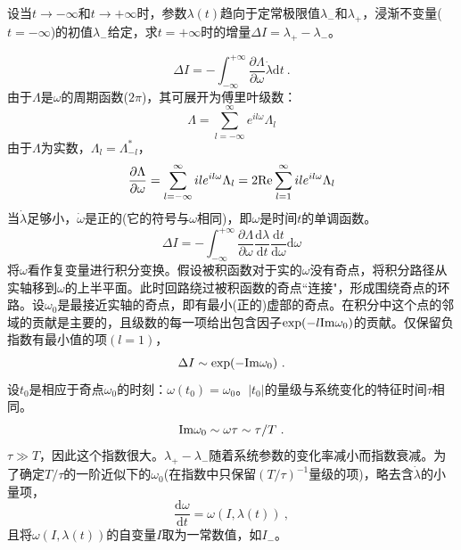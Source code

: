 \documentclass[11pt,a4paper]{article}
\newcommand{\dif}{\mathrm{d}}
\begin{document}
设当$t \rightarrow -\infty$和$t \rightarrow +\infty$时，参数$\lambda(t)$趋向于定常极限值$\lambda_{-}$和$\lambda_{+}$，浸渐不变量($t = -\infty$)的初值$\lambda_{-}$给定，求$t = +\infty$时的增量$\Delta I = \lambda_{+} -\lambda_{-}$。


\begin{equation}
\Delta I = -\int_{-\infty}^{+\infty} \dfrac{\partial \Lambda}{\partial \omega} \dot \lambda  \dif t ~.
\end{equation}
由于$\Lambda$是$\omega$的周期函数($2\pi$)，其可展开为傅里叶级数：
\begin{equation}
\Lambda = \sum_{l=-\infty}^\infty e^{il\omega} \Lambda_l 
\end{equation}
由于$ \Lambda$为实数，$ \Lambda_l  =  \Lambda^\ast_{-l} $，
\begin{equation}
\dfrac{\partial \Lambda}{\partial \omega} = \sum_{l=-\infty}^\infty il e^{il\omega} \Lambda_l = 2{\rm Re} \sum_{l=1}^\infty il e^{il\omega} \Lambda_l
\end{equation}
当$\dot \lambda$足够小，$\dot \omega$是正的(它的符号与$\omega$相同)，即$\omega$是时间$t$的单调函数。
\begin{equation}
\Delta I = -\int_{-\infty}^{+\infty} \dfrac{\partial \Lambda}{\partial \omega} \dfrac{\dif \lambda}{\dif t} \dfrac{\dif t}{\dif \omega} \dif \omega
\end{equation}
将$\omega$看作复变量进行积分变换。假设被积函数对于实的$\omega$没有奇点，将积分路径从实轴移到$\omega$的上半平面。此时回路绕过被积函数的奇点``连接"，形成围绕奇点的环路。设$\omega_0$是最接近实轴的奇点，即有最小(正的)虚部的奇点。在积分中这个点的邻域的贡献是主要的，且级数的每一项给出包含因子$\exp (-l {\rm Im} \omega_0)$的贡献。仅保留负指数有最小值的项$(l=1)$，
\begin{equation}
\Delta I \sim \exp (-{\rm Im} \omega_0) ~.
\end{equation}
设$t_0$是相应于奇点$\omega_0$的时刻：$\omega(t_0) = \omega_0$。$|t_0|$的量级与系统变化的特征时间$\tau$相同。
\begin{equation}
{\rm Im} \omega_0 \sim \omega \tau \sim \tau/T ~.
\end{equation}
$\tau \gg T$，因此这个指数很大。$\lambda_{+} -\lambda_{-}$随着系统参数的变化率减小而指数衰减。为了确定$T/\tau$的一阶近似下的$\omega_0$(在指数中只保留$(T/\tau)^{-1}$量级的项)，略去含$\dot \lambda$的小量项，
\begin{equation}
\dfrac{\dif \omega}{\dif t} = \omega(I, \lambda(t) ) ~,
\end{equation}
且将$\omega(I, \lambda(t) )$的自变量$I$取为一常数值，如$I_{-}$。
\end{document}
